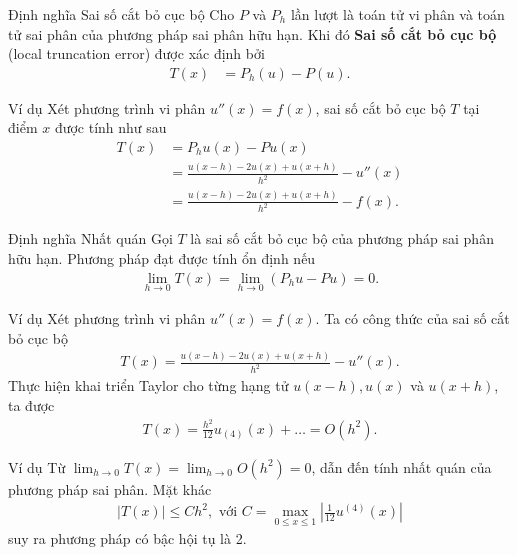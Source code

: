 \documentclass[9pt]{beamer}
\numberwithin{equation}{section}
\begin{document}
\begin{frame}
\begin{block}{Định nghĩa Sai số cắt bỏ cục bộ}
    Cho $P$ và $P_h$ lần lượt là toán tử vi phân và toán tử sai phân của phương pháp sai phân hữu hạn. Khi đó \textbf{Sai số cắt bỏ cục bộ} (local truncation error) được xác định bởi
    \begin{align*}
        T(x) &= P_h(u) - P(u).
    \end{align*}
\end{block}

\begin{exampleblock}{Ví dụ}
    Xét phương trình vi phân $u''(x) = f(x)$, sai số cắt bỏ cục bộ $T$ tại điểm $x$ được tính như sau
    \begin{align*}
        T(x) &= P_h u(x) - Pu(x) \\
        &= \frac{u(x-h) - 2u(x) + u(x+h)}{h^2} - u''(x) \\
        &= \frac{u(x-h) - 2u(x) + u(x+h)}{h^2} - f(x).
    \end{align*}
\end{exampleblock}
\end{frame}

\begin{frame}
\begin{block}{Định nghĩa Nhất quán}
    Gọi $T$ là sai số cắt bỏ cục bộ của phương pháp sai phân hữu hạn. Phương pháp đạt được tính ổn định nếu
    \begin{align*}
        \lim_{h \to 0} T(x) = \lim_{h \to 0} (P_h u - Pu) = 0.
    \end{align*}
\end{block}

\begin{exampleblock}{Ví dụ}
    Xét phương trình vi phân $u''(x) = f(x)$. Ta có công thức của sai số cắt bỏ cục bộ
    \begin{align*}
        T(x) = \frac{u(x-h) - 2u(x) + u(x+h)}{h^2} - u''(x).
    \end{align*}
    Thực hiện khai triển Taylor cho từng hạng tử $u(x-h), u(x)$ và $u(x+h)$, ta được
    \begin{align*}
        T(x) = \frac{h^2}{12} u_{(4)} (x) + \ldots = O(h^2).
    \end{align*}
\end{exampleblock}
\end{frame}

\begin{frame}
\begin{exampleblock}{Ví dụ}
    Từ $\lim_{h \to 0} T(x) = \lim_{h \to 0} O(h^2) = 0$, dẫn đến tính nhất quán của phương pháp sai phân. Mặt khác
    \begin{align*}
        |T(x)| \le Ch^2, \text{ với } C = \max_{0 \le x \le 1} \left|\frac{1}{12} u^{(4)}(x)\right|
    \end{align*}
    suy ra phương pháp có bậc hội tụ là 2.
\end{exampleblock}    
\end{frame}
\end{document}
